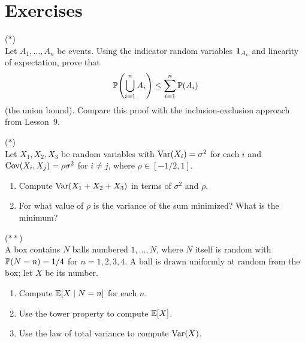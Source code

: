 \documentclass[11pt,a4paper]{article}
\begin{document}

\section{Exercises}
\label{sec:exercises}

\begin{exercise}
\textnormal{(\(\ast\))} \\
Let $A_1, \ldots, A_n$ be events. Using the indicator random variables
$\mathbf{1}_{A_i}$ and linearity of expectation, prove that
\[
    \mathbb{P}\!\left(\bigcup_{i=1}^n A_i\right)
    \leq \sum_{i=1}^n \mathbb{P}(A_i)
\]
(the union bound). Compare this proof with the inclusion-exclusion
approach from Lesson~9.
\end{exercise}

\begin{exercise}
\textnormal{(\(\ast\))} \\
Let $X_1, X_2, X_3$ be random variables with $\operatorname{Var}(X_i) = \sigma^2$
for each $i$ and $\operatorname{Cov}(X_i, X_j) = \rho \sigma^2$ for $i \neq j$,
where $\rho \in [-1/2, 1]$.
\begin{enumerate}[nosep,label=(\alph*)]
    \item Compute $\operatorname{Var}(X_1 + X_2 + X_3)$ in terms of $\sigma^2$ and
    $\rho$.
    \item For what value of $\rho$ is the variance of the sum minimized?
    What is the minimum?
\end{enumerate}
\end{exercise}

\begin{exercise}
\textnormal{(\(\ast\ast\))} \\
A box contains $N$ balls numbered $1, \ldots, N$, where $N$ itself is
random with $\mathbb{P}(N = n) = 1/4$ for $n = 1, 2, 3, 4$. A ball is drawn
uniformly at random from the box; let $X$ be its number.
\begin{enumerate}[nosep,label=(\alph*)]
    \item Compute $\mathbb{E}[X \mid N = n]$ for each $n$.
    \item Use the tower property to compute $\mathbb{E}[X]$.
    \item Use the law of total variance to compute $\operatorname{Var}(X)$.
\end{enumerate}
\end{exercise}
\end{document}
